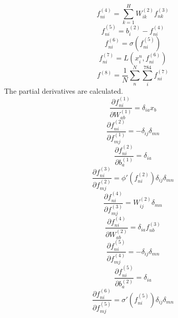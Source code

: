 \documentclass[fleqn]{report}
\begin{document}
\begin{equation}
    f^{(4)}_{ni} = \sum_{k=1}^H W^{(2)}_{ik} f^{(3)}_{nk}
\end{equation}
\begin{equation}
    f^{(5)}_{ni} = b^{(2)}_i - f^{(4)}_{ni}
\end{equation}
\begin{equation}
    f^{(6)}_{ni} = \sigma \left ( f^{(5)}_{ni} \right )
\end{equation}
\begin{equation}
    f^{(7)}_{ni} = L\left(x_i^n, f^{(6)}_{ni}\right)
\end{equation}
\begin{equation}
    f^{(8)} = \frac{1}{N} \sum_n^N \sum_i^{784} f^{(7)}_{ni}
\end{equation}
The partial derivatives are calculated.
\begin{equation}
    \frac{\partial f^{(1)}_{ni}}{\partial W^{(1)}_{ab}} = \delta_{ia} x_b
\end{equation}
\begin{equation}
    \frac{\partial f^{(2)}_{ni}}{\partial f^{(1)}_{mj}} = - \delta_{ij} \delta_{mn}
\end{equation}
\begin{equation}
    \frac{\partial f^{(2)}_{ni}}{\partial b^{(1)}_{a}} = \delta_{ia}
\end{equation}
\begin{equation}
    \frac{\partial f^{(3)}_{ni}}{\partial f^{(2)}_{mj}} = \phi'(f^{(2)}_{ni}) \delta_{ij} \delta_{mn}
\end{equation}
\begin{equation}
    \frac{\partial f^{(4)}_{ni}}{\partial f^{(3)}_{mj}} = W^{(2)}_{ij} \delta_{mn}
\end{equation}
\begin{equation}
    \frac{\partial f^{(4)}_{ni}}{\partial W^{(2)}_{ab}} = \delta_{ia} f^{(3)}_{nb}
\end{equation}
\begin{equation}
    \frac{\partial f^{(5)}_{ni}}{\partial f^{(4)}_{mj}} = - \delta_{ij} \delta_{mn}
\end{equation}
\begin{equation}
    \frac{\partial f^{(5)}_{ni}}{\partial b^{(2)}_{a}} = \delta_{ia}
\end{equation}
\begin{equation}
    \frac{\partial f^{(6)}_{ni}}{\partial f^{(5)}_{mj}} = \sigma'\left(f^{(5)}_{ni}\right) \delta_{ij} \delta_{mn}
\end{equation}
\end{document}
